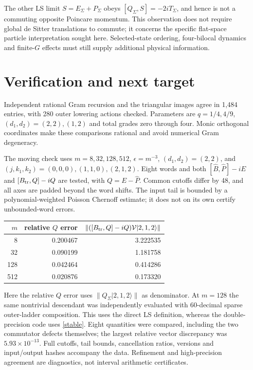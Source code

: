 \documentclass[11pt]{article}
\newcommand{\eps}{\epsilon}
\newcommand{\ket}[1]{|#1\rangle}
\newcommand{\B}{\widehat B}
\newcommand{\PP}{\widehat P}
\newcommand{\Bt}{B_{\rm tr}}
\newcommand{\V}{\mathcal V}
\begin{document}
The other LS limit $S=E_\Sigma+P_\Sigma$ obeys
$[Q_\Sigma,S]=-2iT_\Sigma$, and hence is not a commuting
opposite Poincare momentum. This observation does not require
global de Sitter translations to commute; it concerns the
specific flat-space particle interpretation sought here.
Selected-state ordering, four-bilocal dynamics and finite-$G$
effects must still supply additional physical information.

\newpage
\section{Verification and next target}
Independent rational Gram recursion and the triangular images
agree in 1,484 entries, with 280 outer lowering actions checked.
Parameters are $q=1/4,4/9$, $(d_1,d_2)=(2,2),(1,2)$ and total
grades zero through four. Monic orthogonal coordinates make
these comparisons rational and avoid numerical Gram degeneracy.

The moving check uses $m=8,32,128,512$, $\eps=m^{-3}$,
$(d_1,d_2)=(2,2)$, and
$(j,k_1,k_2)=(0,0,0),(1,1,0),(2,1,2)$.
Eight words and both $[\B,\PP]-iE$ and $[\Bt,Q]-iQ$ are tested,
with $Q=E-\PP$. Common cutoffs differ by 48, and all axes are
padded beyond the word shifts. The input tail is bounded by a
polynomial-weighted Poisson Chernoff estimate; it does not on
its own certify unbounded-word errors.

\begin{center}
\begin{tabular}{rrr}
\toprule
$m$ & relative $Q$ error & $\|([\Bt,Q]-iQ)\V\ket{2,1,2}\|$\\
\midrule
8 & 0.200467 & 3.222535\\
32 & 0.090199 & 1.181758\\
128 & 0.042464 & 0.414286\\
512 & 0.020876 & 0.173320\\
\bottomrule
\end{tabular}
\end{center}
Here the relative $Q$ error uses
$\|Q_\Sigma\ket{2,1,2}\|$ as denominator. At $m=128$ the
same nontrivial descendant was independently evaluated with
60-decimal sparse outer-ladder composition. This uses the direct
LS definition, whereas the double-precision code uses
\eqref{stable}. Eight quantities were compared, including the
two commutator defects themselves; the largest relative vector
discrepancy was $5.93\times10^{-13}$. Full cutoffs, tail bounds,
cancellation ratios, versions and input/output hashes accompany
the data. Refinement and high-precision agreement are diagnostics,
not interval arithmetic certificates.
\end{document}
